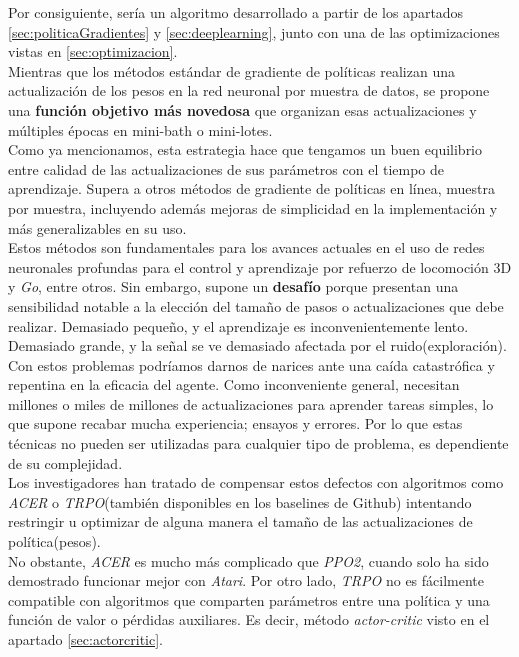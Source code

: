 \documentclass[11pt,fleqn]{book} %
\begin{document}
Por consiguiente, sería un algoritmo desarrollado a partir de los apartados \ref{sec:politicaGradientes} y \ref{sec:deeplearning}, junto con una de las optimizaciones vistas en \ref{sec:optimizacion}. \\

Mientras que los métodos estándar de gradiente de políticas realizan una actualización de los pesos en la red neuronal por muestra de datos, se propone una \textbf{función objetivo más novedosa} que organizan esas actualizaciones y múltiples épocas en mini-bath o mini-lotes. \\

Como ya mencionamos, esta estrategia hace que tengamos un buen equilibrio entre calidad de las actualizaciones de sus parámetros con el tiempo de aprendizaje. Supera a otros métodos de gradiente de políticas en línea, muestra por muestra, incluyendo además mejoras de simplicidad en la implementación y más generalizables en su uso. \\

Estos métodos son fundamentales para los avances actuales en el uso de redes neuronales profundas para el control y aprendizaje por refuerzo de locomoción 3D y \textit{Go}, entre otros. Sin embargo, supone un \textbf{desafío} porque presentan una sensibilidad notable a la elección del tamaño de pasos o actualizaciones que debe realizar. Demasiado pequeño, y el aprendizaje es inconvenientemente lento. Demasiado grande, y la señal se ve demasiado afectada por el ruido(exploración). \\

Con estos problemas podríamos darnos de narices ante una caída catastrófica y repentina en la eficacia del agente. Como inconveniente general, necesitan millones o miles de millones de actualizaciones para aprender tareas simples, lo que supone recabar mucha experiencia; ensayos y errores. Por lo que estas técnicas no pueden ser utilizadas para cualquier tipo de problema, es dependiente de su complejidad. \\

Los investigadores han tratado de compensar estos defectos con algoritmos como \textit{ACER} o \textit{TRPO}(también disponibles en los baselines de Github) intentando restringir u optimizar de alguna manera el tamaño de las actualizaciones de política(pesos). \\

No obstante, \textit{ACER} es mucho más complicado que \textit{PPO2}, cuando solo ha sido demostrado funcionar mejor con \textit{Atari}. Por otro lado, \textit{TRPO} no es fácilmente compatible con algoritmos que comparten parámetros entre una política y una función de valor o pérdidas auxiliares. Es decir, método \textit{actor-critic} visto en el apartado \ref{sec:actorcritic}. \\
\end{document}
